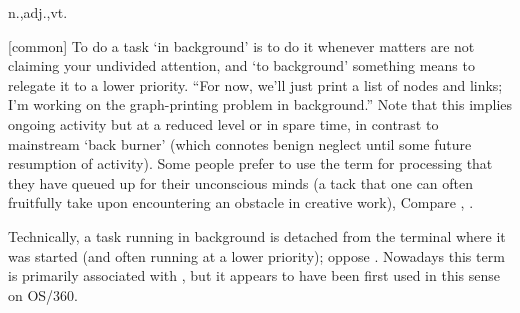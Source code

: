  n.,adj.,vt.

[common] To do a task `in background' is to do it whenever
 matters are not claiming your undivided attention, and
`to background' something means to relegate it to a lower priority. ``For now,
we'll just print a list of nodes and links; I'm working on the graph-printing
problem in background.'' Note that this implies ongoing activity but at a
reduced level or in spare time, in contrast to mainstream `back burner' (which
connotes benign neglect until some future resumption of activity). Some people
prefer to use the term for processing that they have queued up for their
unconscious minds (a tack that one can often fruitfully take upon encountering
an obstacle in creative work), Compare ,
.

Technically, a task running in background is detached from the terminal where it
was started (and often running at a lower priority); oppose
. Nowadays this term is primarily associated with
, but it appears to have been first used in this sense on
OS/360.

